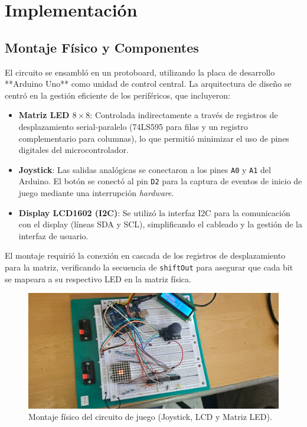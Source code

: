 \section{Implementación}

\subsection{Montaje Físico y Componentes}
El circuito se ensambló en un protoboard, utilizando la placa de desarrollo **Arduino Uno** como unidad de control central. La arquitectura de diseño se centró en la gestión eficiente de los periféricos, que incluyeron:

\begin{itemize}
        \item \textbf{Matriz LED $8\times8$}: Controlada indirectamente a través de registros de desplazamiento serial-paralelo (74LS595 para filas y un registro complementario para columnas), lo que permitió minimizar el uso de pines digitales del microcontrolador.
            \item \textbf{Joystick}: Las salidas analógicas se conectaron a los pines \texttt{A0} y \texttt{A1} del Arduino. El botón se conectó al pin \texttt{D2} para la captura de eventos de inicio de juego mediante una interrupción \textit{hardware}.
                \item \textbf{Display LCD1602 (I2C)}: Se utilizó la interfaz I2C para la comunicación con el display (líneas SDA y SCL), simplificando el cableado y la gestión de la interfaz de usuario.
\end{itemize}

El montaje requirió la conexión en cascada de los registros de desplazamiento para la matriz, verificando la secuencia de \texttt{shiftOut} para asegurar que cada bit se mapeara a su respectivo LED en la matriz física.

\begin{figure}[h]
        \centering
            \caption{Montaje físico del circuito de juego (Joystick, LCD y Matriz LED).}
                \label{fig:montaje_fisico}
                    \includegraphics[width=0.8\linewidth]{Diagramas/Imagen de WhatsApp 2025-09-26 a las 22.01.48_a38513c5.jpg}
\end{figure}

